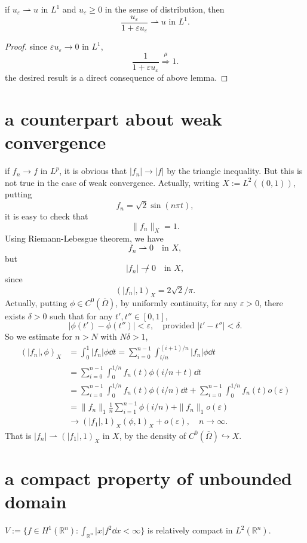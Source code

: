 \begin{example}
if $u_\varepsilon\rightharpoonup u$ in $L^1$ and $u_\varepsilon\geqslant0$ in the sense of distribution, then $$\frac{u_\varepsilon}{1 + \varepsilon u_\varepsilon}\rightharpoonup u \text{ in } L^1.$$
\begin{proof}
since $\varepsilon u_\varepsilon\rightarrow 0$ in $L^1$, $$\frac{1}{1 + \varepsilon u_\varepsilon}\stackrel{\mu}{\Longrightarrow}1.$$
the desired result is a direct consequence of above lemma.
\end{proof}
\end{example}

\section{a counterpart about weak convergence}

if $f_n\to f$ in $L^p$, it is obvious that $|f_n|\to |f|$ by the triangle inequality.
But this is not true in the case of weak convergence.
Actually, writing $X:=L^2((0,1))$, putting 
\[
f_n = \sqrt2\sin(n\pi t),
\]
it is easy to check that 
\[
\|f_n\|_X = 1.
\]
Using Riemann-Lebesgue theorem,
we have 
\[
f_n \rightharpoonup 0\quad\text{in }X,
\]
but 
\[
|f_n| \not\rightharpoonup 0\quad \text{in }X,
\]
since 
\[
(|f_n|,1)_X = 2\sqrt2/\pi.
\]
Actually, putting $\phi\in C^0(\overline{\Omega})$, by uniformly continuity, 
for any $\varepsilon>0$, there exists $\delta>0$ such that for any $t', t''\in[0,1]$,
\[
|\phi(t')-\phi(t'')|<\varepsilon,\quad\text{provided } |t'-t''|<\delta.
\]
So we estimate for $n>N$ with $N\delta>1$,
\begin{align*}
(|f_n|,\phi)_X 
&= \int_0^1|f_n|\phi\dd t = \sum_{i=0}^{n-1}\int_{i/n}^{(i+1)/n}|f_n|\phi\dd t\\
&= \sum_{i=0}^{n-1}\int_0^{1/n} f_n(t)\phi(i/n+t)\dd t\\
&= \sum_{i=0}^{n-1}\int_0^{1/n} f_n(t)\phi(i/n)\dd t 
	+ \sum_{i=0}^{n-1}\int_0^{1/n}f_n(t)o (\varepsilon)\\
&= \|f_n\|_1\frac1n\sum_{i=1}^{n-1}\phi(i/n) + \|f_n\|_1o(\varepsilon)\\
&\to (|f_1|,1)_X (\phi,1)_X + o(\varepsilon),\quad n\to\infty.
\end{align*}
That is $|f_n|\rightharpoonup (|f_1|,1)_X$ in $X$, 
by the density of $C^0(\overline\Omega)\hookrightarrow X$.

\section{a compact property of unbounded domain}
\begin{lemma}
	$V:=\{f\in H^1(\mathbb{R}^n): \int_{\mathbb R^n}|x|f^2\dd x<\infty\}$ 
	is relatively compact in $L^2(\mathbb{R}^n)$.
\end{lemma}

